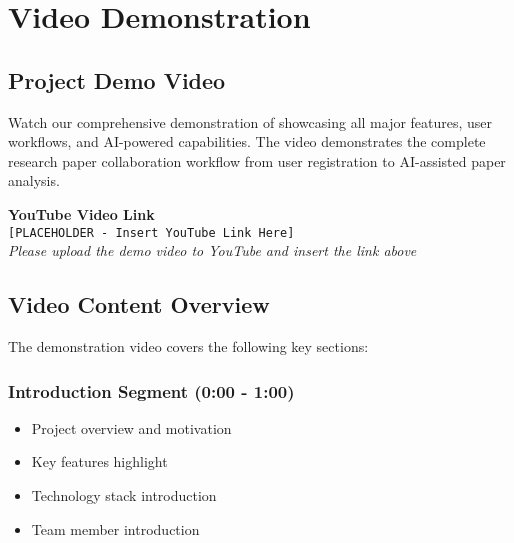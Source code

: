 \chapter{Video Demonstration}
\label{ch:video-demo}

\section{Project Demo Video}
\label{sec:video-demo}

\begin{infobox}
Watch our comprehensive demonstration of \projectname{} showcasing all major features, user workflows, and AI-powered capabilities. The video demonstrates the complete research paper collaboration workflow from user registration to AI-assisted paper analysis.
\end{infobox}

\vspace{1cm}

\begin{center}
\begin{tcolorbox}[
    colback=lightgray,
    colframe=primaryblue,
    width=0.9\textwidth,
    arc=3mm,
    boxrule=1.5pt
]
\centering
\Large\textbf{YouTube Video Link}\\[0.5cm]
\normalsize
\faYoutube{} \texttt{[PLACEHOLDER - Insert YouTube Link Here]}\\[0.5cm]
\textit{Please upload the demo video to YouTube and insert the link above}
\end{tcolorbox}
\end{center}

\vspace{1cm}

\section{Video Content Overview}
\label{sec:video-content}

The demonstration video covers the following key sections:

\subsection{Introduction Segment (0:00 - 1:00)}
\begin{itemize}[leftmargin=*]
    \item Project overview and motivation
    \item Key features highlight
    \item Technology stack introduction
    \item Team member introduction
\end{itemize}

